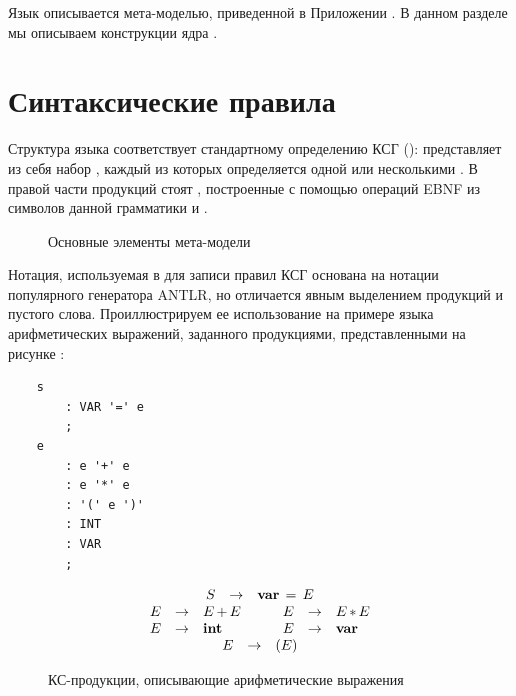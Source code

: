 Язык  описывается мета-моделью, приведенной в Приложении . В данном разделе мы описываем конструкции ядра .

\section{Синтаксические правила}

Структура языка соответствует стандартному определению КСГ ():  представляет из себя набор , каждый из которых определяется одной или несколькими . В правой части продукций стоят , построенные с помощью операций EBNF из символов данной грамматики и .

\begin{figure}[htbp]
\caption{Основные элементы мета-модели }\label{GCore}
\end{figure}

Нотация, используемая в  для записи правил КСГ основана на нотации популярного генератора ANTLR, но отличается явным выделением продукций и пустого слова. Проиллюстрируем ее использование на примере языка арифметических выражений, заданного продукциями, представленными на рисунке :
\begin{lstlisting}
	s
		: VAR '=' e
		;
	e
		: e '+' e
		: e '*' e
		: '(' e ')'
		: INT
		: VAR
		;
\end{lstlisting}

\begin{figure}[htbp]
\newcommand{\gp}[2]{#1 & \rightarrow & #2 }
$$
\begin{array}{rcllrcl}
\multicolumn{7}{c}{
	\begin{array}{rcl}
		\gp{S}{\mathbf{var} \, = \, E}\\
	\end{array}
}\\
\gp{E}{E \, \mathbf{+} \, E}&\quad&
\gp{E}{E \, \mathbf{*} \, E}\\
\gp{E}{\mathbf{int}} &&
\gp{E}{\mathbf{var}} \\
\multicolumn{7}{c}{
	\begin{array}{rcl}
		\gp{E}{\mathbf{(} E \mathbf{)}}\\
	\end{array}
}\\
\end{array}
$$
\caption{КС-продукции, описывающие арифметические выражения}\label{ArithProd}
\end{figure}

